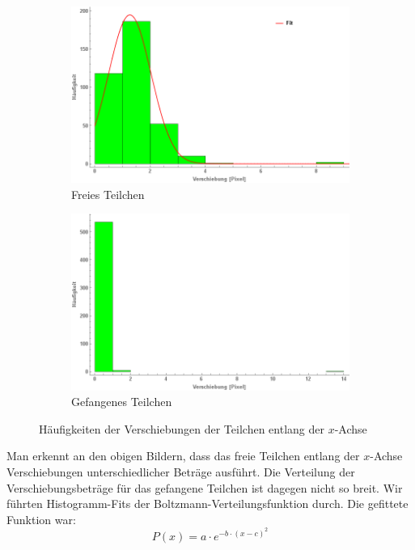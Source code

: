 \documentclass[a4paper,titlepage]{scrartcl}
\numberwithin{equation}{section}
\begin{document}
\begin{figure}[H]
\centering
\begin{subfigure}{.5\textwidth}
  \centering
  \includegraphics[width=.95\linewidth]{frei-x-dms.png}
  \caption{Freies Teilchen}
  \label{fig:dmsxfrei}
\end{subfigure}%
\begin{subfigure}{.5\textwidth}
  \centering
  \includegraphics[width=.95\linewidth]{fest-x-dms.png}
  \caption{Gefangenes Teilchen}
  \label{fig:dmsxfest}
\end{subfigure}
\caption{Häufigkeiten der Verschiebungen der Teilchen entlang der $x$-Achse}
\label{fig:dmsx}
\end{figure}
Man erkennt an den obigen Bildern, dass das freie Teilchen entlang der $x$-Achse Verschiebungen unterschiedlicher Beträge ausführt. Die Verteilung der Verschiebungsbeträge für das gefangene Teilchen ist dagegen nicht so breit. Wir führten Histogramm-Fits der Boltzmann-Verteilungsfunktion durch. Die gefittete Funktion war:
\begin{equation}
\label{eq:fitfn}
P(x)=a \cdot e^{-b \cdot (x-c)^2}
\end{equation}
\end{document}
